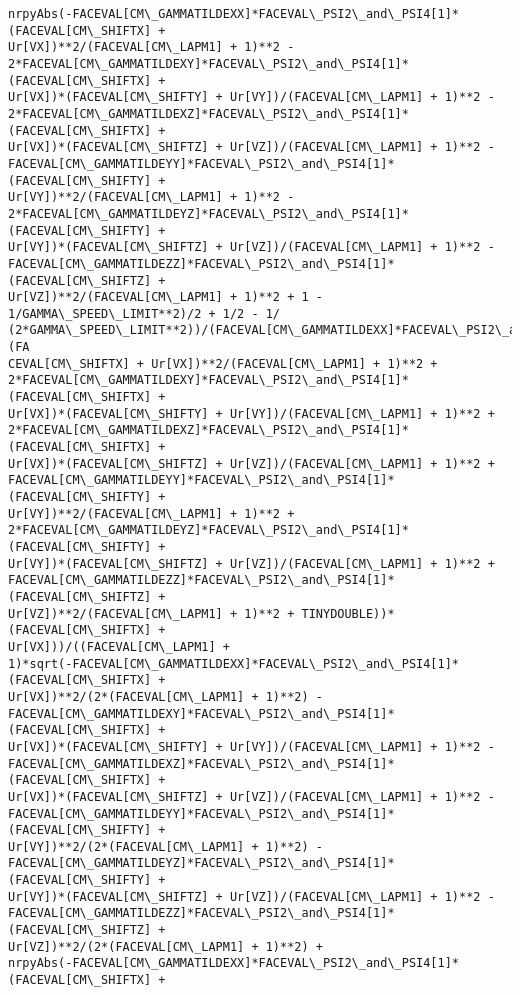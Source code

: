 \documentclass[landscape,letterpaper,10pt,english]{article}
\begin{document}
\begin{Verbatim}[commandchars=\\\{\}]
nrpyAbs(-FACEVAL[CM\_GAMMATILDEXX]*FACEVAL\_PSI2\_and\_PSI4[1]*(FACEVAL[CM\_SHIFTX] +
Ur[VX])**2/(FACEVAL[CM\_LAPM1] + 1)**2 -
2*FACEVAL[CM\_GAMMATILDEXY]*FACEVAL\_PSI2\_and\_PSI4[1]*(FACEVAL[CM\_SHIFTX] +
Ur[VX])*(FACEVAL[CM\_SHIFTY] + Ur[VY])/(FACEVAL[CM\_LAPM1] + 1)**2 -
2*FACEVAL[CM\_GAMMATILDEXZ]*FACEVAL\_PSI2\_and\_PSI4[1]*(FACEVAL[CM\_SHIFTX] +
Ur[VX])*(FACEVAL[CM\_SHIFTZ] + Ur[VZ])/(FACEVAL[CM\_LAPM1] + 1)**2 -
FACEVAL[CM\_GAMMATILDEYY]*FACEVAL\_PSI2\_and\_PSI4[1]*(FACEVAL[CM\_SHIFTY] +
Ur[VY])**2/(FACEVAL[CM\_LAPM1] + 1)**2 -
2*FACEVAL[CM\_GAMMATILDEYZ]*FACEVAL\_PSI2\_and\_PSI4[1]*(FACEVAL[CM\_SHIFTY] +
Ur[VY])*(FACEVAL[CM\_SHIFTZ] + Ur[VZ])/(FACEVAL[CM\_LAPM1] + 1)**2 -
FACEVAL[CM\_GAMMATILDEZZ]*FACEVAL\_PSI2\_and\_PSI4[1]*(FACEVAL[CM\_SHIFTZ] +
Ur[VZ])**2/(FACEVAL[CM\_LAPM1] + 1)**2 + 1 - 1/GAMMA\_SPEED\_LIMIT**2)/2 + 1/2 - 1/
(2*GAMMA\_SPEED\_LIMIT**2))/(FACEVAL[CM\_GAMMATILDEXX]*FACEVAL\_PSI2\_and\_PSI4[1]*(FA
CEVAL[CM\_SHIFTX] + Ur[VX])**2/(FACEVAL[CM\_LAPM1] + 1)**2 +
2*FACEVAL[CM\_GAMMATILDEXY]*FACEVAL\_PSI2\_and\_PSI4[1]*(FACEVAL[CM\_SHIFTX] +
Ur[VX])*(FACEVAL[CM\_SHIFTY] + Ur[VY])/(FACEVAL[CM\_LAPM1] + 1)**2 +
2*FACEVAL[CM\_GAMMATILDEXZ]*FACEVAL\_PSI2\_and\_PSI4[1]*(FACEVAL[CM\_SHIFTX] +
Ur[VX])*(FACEVAL[CM\_SHIFTZ] + Ur[VZ])/(FACEVAL[CM\_LAPM1] + 1)**2 +
FACEVAL[CM\_GAMMATILDEYY]*FACEVAL\_PSI2\_and\_PSI4[1]*(FACEVAL[CM\_SHIFTY] +
Ur[VY])**2/(FACEVAL[CM\_LAPM1] + 1)**2 +
2*FACEVAL[CM\_GAMMATILDEYZ]*FACEVAL\_PSI2\_and\_PSI4[1]*(FACEVAL[CM\_SHIFTY] +
Ur[VY])*(FACEVAL[CM\_SHIFTZ] + Ur[VZ])/(FACEVAL[CM\_LAPM1] + 1)**2 +
FACEVAL[CM\_GAMMATILDEZZ]*FACEVAL\_PSI2\_and\_PSI4[1]*(FACEVAL[CM\_SHIFTZ] +
Ur[VZ])**2/(FACEVAL[CM\_LAPM1] + 1)**2 + TINYDOUBLE))*(FACEVAL[CM\_SHIFTX] +
Ur[VX]))/((FACEVAL[CM\_LAPM1] +
1)*sqrt(-FACEVAL[CM\_GAMMATILDEXX]*FACEVAL\_PSI2\_and\_PSI4[1]*(FACEVAL[CM\_SHIFTX] +
Ur[VX])**2/(2*(FACEVAL[CM\_LAPM1] + 1)**2) -
FACEVAL[CM\_GAMMATILDEXY]*FACEVAL\_PSI2\_and\_PSI4[1]*(FACEVAL[CM\_SHIFTX] +
Ur[VX])*(FACEVAL[CM\_SHIFTY] + Ur[VY])/(FACEVAL[CM\_LAPM1] + 1)**2 -
FACEVAL[CM\_GAMMATILDEXZ]*FACEVAL\_PSI2\_and\_PSI4[1]*(FACEVAL[CM\_SHIFTX] +
Ur[VX])*(FACEVAL[CM\_SHIFTZ] + Ur[VZ])/(FACEVAL[CM\_LAPM1] + 1)**2 -
FACEVAL[CM\_GAMMATILDEYY]*FACEVAL\_PSI2\_and\_PSI4[1]*(FACEVAL[CM\_SHIFTY] +
Ur[VY])**2/(2*(FACEVAL[CM\_LAPM1] + 1)**2) -
FACEVAL[CM\_GAMMATILDEYZ]*FACEVAL\_PSI2\_and\_PSI4[1]*(FACEVAL[CM\_SHIFTY] +
Ur[VY])*(FACEVAL[CM\_SHIFTZ] + Ur[VZ])/(FACEVAL[CM\_LAPM1] + 1)**2 -
FACEVAL[CM\_GAMMATILDEZZ]*FACEVAL\_PSI2\_and\_PSI4[1]*(FACEVAL[CM\_SHIFTZ] +
Ur[VZ])**2/(2*(FACEVAL[CM\_LAPM1] + 1)**2) +
nrpyAbs(-FACEVAL[CM\_GAMMATILDEXX]*FACEVAL\_PSI2\_and\_PSI4[1]*(FACEVAL[CM\_SHIFTX] +

\end{Verbatim}
\end{document}
